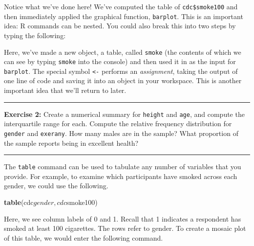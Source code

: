 \documentclass[]{book}
\newenvironment{Shaded}{\begin{snugshade}}{\end{snugshade}}
\newcommand{\KeywordTok}[1]{\textcolor[rgb]{0.13,0.29,0.53}{\textbf{{#1}}}}
\newcommand{\StringTok}[1]{\textcolor[rgb]{0.31,0.60,0.02}{{#1}}}
\newcommand{\NormalTok}[1]{{#1}}
\theoremstyle{definition}
\theoremstyle{definition}
\theoremstyle{definition}
\theoremstyle{remark}
\begin{document}
Notice what we've done here! We've computed the table of
\texttt{cdc\$smoke100} and then immediately applied the graphical
function, \texttt{barplot}. This is an important idea: R commands can be
nested. You could also break this into two steps by typing the
following:

\begin{Shaded}
\end{Shaded}

Here, we've made a new object, a table, called \texttt{smoke} (the
contents of which we can see by typing \texttt{smoke} into the console)
and then used it in as the input for \texttt{barplot}. The special
symbol \texttt{\textless{}-} performs an \emph{assignment}, taking the
output of one line of code and saving it into an object in your
workspace. This is another important idea that we'll return to later.

\begin{center}\rule{0.5\linewidth}{\linethickness}\end{center}

\textbf{Exercise 2:} Create a numerical summary for \texttt{height} and
\texttt{age}, and compute the interquartile range for each. Compute the
relative frequency distribution for \texttt{gender} and
\texttt{exerany}. How many males are in the sample? What proportion of
the sample reports being in excellent health?

\begin{center}\rule{0.5\linewidth}{\linethickness}\end{center}

The \texttt{table} command can be used to tabulate any number of
variables that you provide. For example, to examine which participants
have smoked across each gender, we could use the following.

\begin{Shaded}
\begin{Highlighting}[]
\KeywordTok{table}\NormalTok{(cdc$gender,cdc$smoke100)}
\end{Highlighting}
\end{Shaded}

Here, we see column labels of 0 and 1. Recall that 1 indicates a
respondent has smoked at least 100 cigarettes. The rows refer to gender.
To create a mosaic plot of this table, we would enter the following
command.
\end{document}
